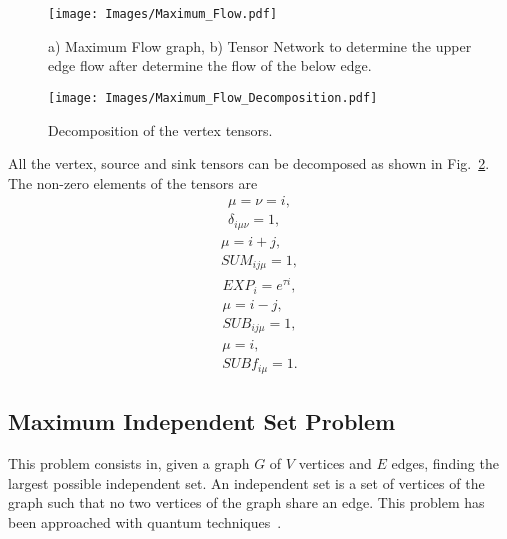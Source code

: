 \begin{figure}
    \centering
    \texttt{[image: Images/Maximum\_Flow.pdf]}
    \caption{a) Maximum Flow graph, b) Tensor Network to determine the upper edge flow after determine the flow of the below edge.}
    \label{fig: Maximum Flow}
\end{figure}

\begin{figure}
    \centering
    \texttt{[image: Images/Maximum\_Flow\_Decomposition.pdf]}
    \caption{Decomposition of the vertex tensors.}
    \label{fig: Maximum Flow Decomp}
\end{figure}


All the vertex, source and sink tensors can be decomposed as shown in Fig.~\ref{fig: Maximum Flow Decomp}. The non-zero elements of the tensors are
\begin{equation}
    \begin{gathered}
        \mu = \nu = i,\\
        \delta_{i\mu\nu} = 1,
    \end{gathered}
\end{equation}
\begin{equation}
    \begin{gathered}
        \mu = i + j,\\
        SUM_{ij\mu} = 1,
    \end{gathered}
\end{equation}
\begin{equation}
    \begin{gathered}
        EXP_{i} = e^{\tau i},
    \end{gathered}
\end{equation}
\begin{equation}
    \begin{gathered}
        \mu = i-j,\\
        SUB_{ij\mu} = 1,
    \end{gathered}
\end{equation}
\begin{equation}
    \begin{gathered}
        \mu= i,\\
        SUBf_{i\mu} = 1.
    \end{gathered}
\end{equation}


\subsection{Maximum Independent Set Problem}
This problem consists in, given a graph $G$ of $V$ vertices and $E$ edges, finding the largest possible independent set. An independent set is a set of vertices of the graph such that no two vertices of the graph share an edge. This problem has been approached with quantum techniques~\cite{Independet_Quantum}.


